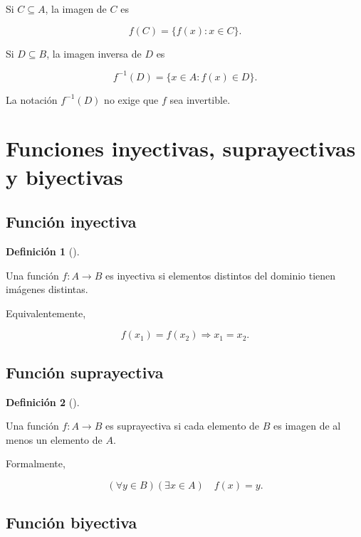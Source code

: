 \documentclass[
  spanish,
  11pt,
  letterpaper,
  DIV=11,
  numbers=noendperiod]{scrreprt}
\theoremstyle{definition}
\newtheorem{definition}{Definición}[chapter]
\theoremstyle{plain}
\theoremstyle{definition}
\theoremstyle{remark}
\begin{document}
Si \(C\subseteq A\), la imagen de \(C\) es

\[
f(C)
=
\{f(x):x\in C\}.
\]

Si \(D\subseteq B\), la imagen inversa de \(D\) es

\[
f^{-1}(D)
=
\{x\in A:f(x)\in D\}.
\]

La notación \(f^{-1}(D)\) no exige que \(f\) sea invertible.

\section{Funciones inyectivas, suprayectivas y
biyectivas}\label{funciones-inyectivas-suprayectivas-y-biyectivas}

\subsection{Función inyectiva}\label{funciuxf3n-inyectiva}

\begin{definition}[]\protect\hypertarget{def-inyectiva}{}\label{def-inyectiva}

Una función \(f:A\to B\) es inyectiva si elementos distintos del dominio
tienen imágenes distintas.

\end{definition}

Equivalentemente,

\[
f(x_1)=f(x_2)
\Rightarrow
x_1=x_2.
\]

\subsection{Función suprayectiva}\label{funciuxf3n-suprayectiva}

\begin{definition}[]\protect\hypertarget{def-suprayectiva}{}\label{def-suprayectiva}

Una función \(f:A\to B\) es suprayectiva si cada elemento de \(B\) es
imagen de al menos un elemento de \(A\).

\end{definition}

Formalmente,

\[
(\forall y\in B)(\exists x\in A)
\quad
f(x)=y.
\]

\subsection{Función biyectiva}\label{funciuxf3n-biyectiva}
\end{document}
